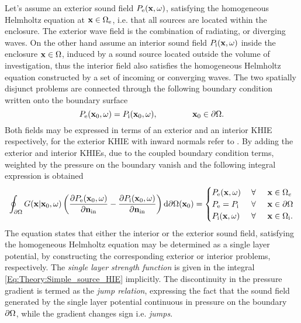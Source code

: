 Let's assume an exterior sound field $P_{\mathrm{e}}(\mathbf{x},\omega)$, satisfying the homogeneous Helmholtz equation at $\mathbf{x} \in \Omega_{\mathrm{e}}$, i.e. that all sources are located within the enclosure. 
The exterior wave field is the combination of radiating, or diverging waves. 
On the other hand assume an interior sound field $P_{\mathrm{i}}(\mathbf{x},\omega)$ inside the enclosure $\mathbf{x} \in \Omega$, induced by a sound source located outside the volume of investigation, thus the interior field also satisfies the homogeneous Helmholtz equation constructed by a set of incoming or converging waves.
The two spatially disjunct problems are connected through the following boundary condition written onto the boundary surface
\begin{equation}
P_{\mathrm{e}}(\vxo,\omega) = P_{\mathrm{i}}(\vxo,\omega), \hspace{15mm} \vxo \in \dO.
\end{equation}
Both fields may be expressed in terms of an exterior and an interior KHIE respectively, for the exterior KHIE with inward normals refer to \cite[eq. 8.30]{Williams1999}.
By adding the exterior and interior KHIEs, due to the coupled boundary condition terms, weighted by the pressure on the boundary vanish and the following integral expression is obtained \cite[p.~268.]{Williams1999}
\begin{equation}
\oint_{\partial \Omega} 
G(\mathbf{x}|\mathbf{x}_0,\omega) 
\left(
\frac{\partial P_{\mathrm{e}}(\mathbf{x}_0,\omega)}{\partial \mathbf{n}_{\mathrm{in}}} - \frac{\partial P_{\mathrm{i}}(\mathbf{x}_0,\omega)}{\partial \mathbf{n}_{\mathrm{in}}} 
\right)
\mathrm{d} \partial \Omega ( \mathbf{x}_0)
= 
\begin{cases} 
P_{\mathrm{e}}(\mathbf{x},\omega)           & \hspace{1mm} \forall \hspace{5mm}  \mathbf{x} \in \Omega_e  	   \\
P_{\mathrm{e}}=P_{\mathrm{i}} & \hspace{1mm} \forall \hspace{5mm}         \mathbf{x} \in \partial \Omega  \\
P_{\mathrm{i}}(\mathbf{x},\omega) 			& \hspace{1mm} \forall \hspace{5mm}   \mathbf{x} \in \Omega_{\mathrm{i}}.
\end{cases}
\label{Eq:Theory:Simple_source_HIE}
\end{equation}
The equation states that either the interior or the exterior sound field, satisfying the homogeneous Helmholtz equation may be determined as a single layer potential, by constructing the corresponding exterior or interior problems, respectively.
The \emph{single layer strength function} is given in the integral \eqref{Eq:Theory:Simple_source_HIE} implicitly.
The discontinuity in the pressure gradient is termed as the \emph{jump relation}, expressing the fact that the sound field generated by the single layer potential continuous in pressure on the boundary $\partial \Omega$, while the gradient changes sign i.e. \emph{jumps}.


